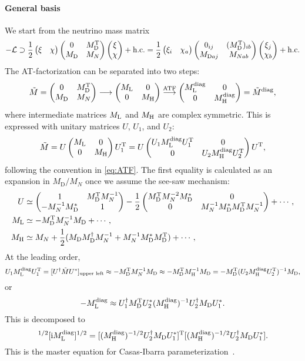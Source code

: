 \documentclass[CheatSheet]{subfiles}
\newcommand\MD[1][]{M_{\mathrm{D}#1}}
\newcommand\MN[1][]{M_{N#1}}
\begin{document}
\paragraph{General basis}
We start from the neutrino mass matrix
\begin{equation}
-\mathcal L\supset \frac12
 \pmat{\xi & \chi} \pmat{0 & \MD^\TT \\ \MD & \MN} \pmat{\xi \\ \chi}+\text{h.c.}
= \frac12\pmat{\xi_i & \chi_a}
\pmat{0_{ij} & (\MD^\TT)_{ib} \\ \MD[aj] & \MN[ab]}
\pmat{\xi_j \\ \chi_b}+\text{h.c.}
\end{equation}
The AT-factorization can be separated into two steps:
\begin{equation}
 \tilde M=\pmat{0 & \MD^\TT \\ \MD & \MN}
\longrightarrow
\pmat{M\w L & 0 \\ 0 & M\w H}
\stackrel{\text{ATF}}\longrightarrow
\pmat{M\w L\wdiag & 0 \\ 0 & M\w H\wdiag}=\tilde M\wdiag,
\end{equation}
where intermediate matrices $M_{\mathrm{L}}$ and $M_{\mathrm{H}}$ are complex symmetric.
This is expressed with unitary matrices $U$, $U_1$, and $U_2$:
\begin{equation}
 \tilde M =
U \begin{pmatrix}M_{\mathrm{L}} & 0 \\ 0 & M_{\mathrm{H}}\end{pmatrix} U_1^{\mathrm{T}} =
U \begin{pmatrix}U_1 M_{\mathrm{L}}^{\text{diag}} U_1^{\mathrm{T}} & 0 \\ 0 & U_2 M_{\mathrm{H}}^{\text{diag}} U_2^{\mathrm{T}}\end{pmatrix} U^{\mathrm{T}},
\end{equation}
following the convention in \cref{eq:ATF}.
The first equality is calculated as an expansion in $\MD/\MN$ once we assume the see-saw mechanism:
\begin{align}
 U&\simeq \pmat{1 & \MD^\TT\MN^{-1} \\ -\MN^{-1}\MD^* & 1}
 - \frac12\pmat{\MD^\TT\MN^{-2}\MD^* & 0 \\ 0 & \MN^{-1}\MD^*\MD^\TT \MN^{-1}} + \cdots,\\
 M\w L&\simeq -\MD^\TT \MN^{-1} \MD+\cdots,\\
 M\w H&\simeq \MN + \frac12 (\MD\MD^\dagger\MN^{-1}+\MN^{-1}\MD^*\MD^\TT)+\cdots,
\end{align}
At the leading order,
\begin{equation*}
 U_1 M\w L\wdiag U_1^\TT = [U^\dagger \tilde M U^*]_{\text{upper left}} \approx -\MD^\TT \MN^{-1}\MD
\approx -\MD^\TT M\w H^{-1}\MD = -\MD^\TT (U_2 M\w H\wdiag U_2^\TT)^{-1}\MD,
\end{equation*}
or
\begin{equation*}
 -M\w L\wdiag \approx U_1^\dagger \MD^\TT U_2^*(M\w H\wdiag)^{-1}U_2^\dagger\MD U_1^*.
\end{equation*}
This is decomposed to
\begin{equation}
 [\ii M\w L\wdiag]^{1/2}[\ii M\w L\wdiag]^{1/2} = 
[(M\w H\wdiag)^{-1/2}U_2^\dagger\MD U_1^*]^\TT
[(M\w H\wdiag)^{-1/2}U_2^\dagger\MD U_1^*].
\end{equation}
This is the master equation for Casas-Ibarra parameterization~\cite{Casas:2001sr}.
\end{document}
